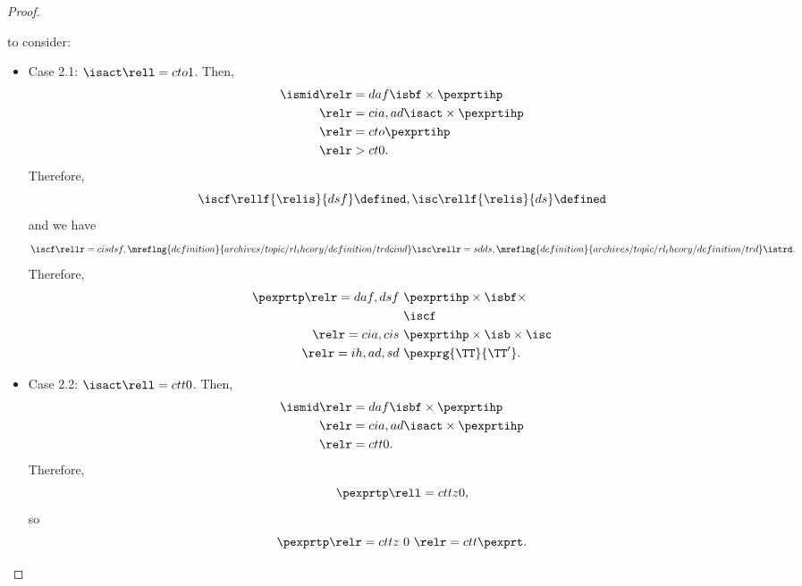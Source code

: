 \begin{proof}
\begin{itemize}
       to consider:
      \begin{itemize}
        \item Case 2.1: $\isact \rell = cto 1$.
          Then,
          \begin{align*}
            \ismid &\relr = daf \isbf \times \pexprtihp\\
                   &\relr = cia,ad \isact \times \pexprtihp\\
                   &\relr = cto \pexprtihp\\
                   &\relr > ct 0.
          \end{align*}
          Therefore, 
          $$\iscf \rellf{\relis}{dsf} \defined,\isc \rellf{\relis}{ds} \defined$$
          and we have
          $$\iscf 
          \rellr = cis dsf,\mreflng{definition}{archives/topic/rl_theory/definition/trdcind} \isc 
          \rellr = sd ds,\mreflng{definition}{archives/topic/rl_theory/definition/trd} \istrd.$$
          Therefore,
          \begin{align*}
            \pexprtp 
            \relr = daf,dsf \ & \pexprtihp \times \isbf \times\\& \iscf\\
            \relr = cia,cis \ & \pexprtihp \times \isb \times \isc\\
            \relr = ih,ad,sd \ & \pexprg{\TT}{\TT'}.
          \end{align*}
        \item Case 2.2: $\isact \rell = ctt 0$.
          Then,
          \begin{align*}
            \ismid &\relr = daf \isbf \times \pexprtihp\\
                   &\relr = cia,ad \isact \times \pexprtihp\\
                   &\relr = ctt 0.
          \end{align*}
          Therefore,
          $$\pexprtp \rell = cttz 0,$$
          so
          $$\pexprtp
          \relr = cttz \ 0 \ 
          \relr = ctt \pexprt.$$
      \end{itemize}
  \end{itemize}
\end{proof}
